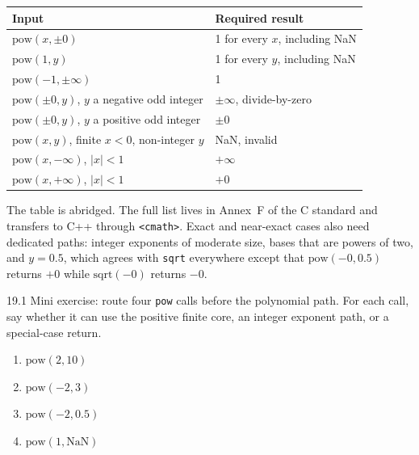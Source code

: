 \documentclass[manuscript, nonacm]{acmart}
\begin{document}
    \begin{table}[tbp]
        \centering
        \begin{tabular}{ll}
            \toprule
            Input                                                 & Required result                \\
            \midrule
            $\mathrm{pow}(x, \pm 0)$                              & 1 for every $x$, including NaN \\
            $\mathrm{pow}(1, y)$                                  & 1 for every $y$, including NaN \\
            $\mathrm{pow}(-1, \pm\infty)$                         & 1                              \\
            $\mathrm{pow}(\pm 0, y)$, $y$ a negative odd integer  & $\pm\infty$, divide-by-zero    \\
            $\mathrm{pow}(\pm 0, y)$, $y$ a positive odd integer  & $\pm 0$                        \\
            $\mathrm{pow}(x, y)$, finite $x < 0$, non-integer $y$ & NaN, invalid                   \\
            $\mathrm{pow}(x, -\infty)$, $|x| < 1$                 & $+\infty$                      \\
            $\mathrm{pow}(x, +\infty)$, $|x| < 1$                 & $+0$                           \\
            \bottomrule
        \end{tabular}
    \end{table}

    The table is abridged. The full list lives in Annex~F of the C standard
    and transfers to C++ through \texttt{<cmath>}. Exact and near-exact
    cases also need dedicated paths: integer exponents of moderate size,
    bases that are powers of two, and $y = 0.5$, which agrees with
    \texttt{sqrt} everywhere except that $\mathrm{pow}(-0, 0.5)$ returns
    $+0$ while $\mathrm{sqrt}(-0)$ returns $-0$.


    \begin{checkpoint}{19.1}
        Mini exercise: route four \texttt{pow} calls before the polynomial path.
        For each call, say whether it can use the positive finite core, an integer
        exponent path, or a special-case return.
        \begin{enumerate}
            \item $\mathrm{pow}(2, 10)$
            \item $\mathrm{pow}(-2, 3)$
            \item $\mathrm{pow}(-2, 0.5)$
            \item $\mathrm{pow}(1, \mathrm{NaN})$
        \end{enumerate}
    \end{checkpoint}
\end{document}
